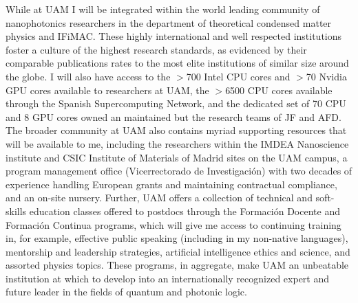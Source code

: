 \documentclass[11pt,a4paper]{article}
\begin{document}
While at UAM I will be integrated within the world leading community of nanophotonics researchers in the department of theoretical condensed matter physics and IFiMAC. These highly international and well respected institutions foster a culture of the highest research standards, as evidenced by their comparable publications rates to the most elite institutions of similar size around the globe. I will also have access to the $>$700 Intel CPU cores and $>$70 Nvidia GPU cores available to researchers at UAM, the $>$6500 CPU cores available through the Spanish Supercomputing Network, and the dedicated set of 70 CPU and 8 GPU cores owned an maintained but the research teams of JF and AFD. The broader community at UAM also contains myriad supporting resources that will be available to me, including the researchers within the IMDEA Nanoscience institute and CSIC Institute of Materials of Madrid sites on the UAM campus, a program management office (Vicerrectorado de Investigaci\'{o}n) with two decades of experience handling European grants and maintaining contractual compliance, and an on-site nursery. Further, UAM offers a collection of technical and soft-skills education classes offered to postdocs through the Formaci\'{o}n Docente and Formaci\'{o}n Continua programs, which will give me access to continuing training in, for example, effective public speaking (including in my non-native languages), mentorship and leadership strategies, artificial intelligence ethics and science, and assorted physics topics. These programs, in aggregate, make UAM an unbeatable institution at which to develop into an internationally recognized expert and future leader in the fields of quantum and photonic logic.






% 
% 
% 
\end{document}
